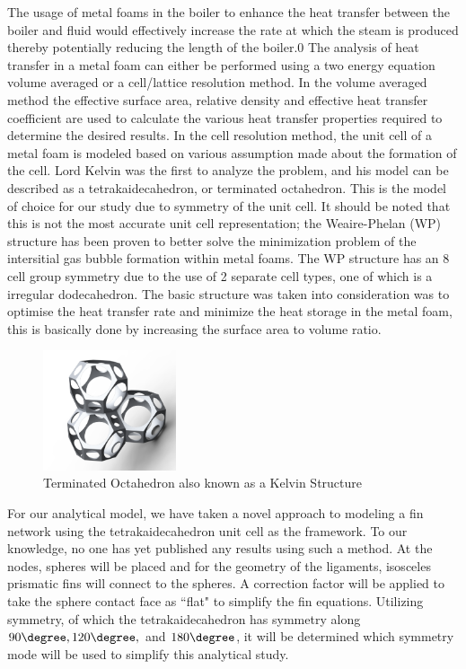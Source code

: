 \documentclass[asme2ejs.tex]{subfiles}
\begin{document}
The usage of metal foams in the boiler to enhance the heat transfer between the boiler and fluid  would effectively increase the rate at which the steam is produced thereby potentially reducing the length of the boiler.0
The analysis of heat transfer in a metal foam can either be performed using a two energy equation volume averaged or a cell/lattice resolution method.
In the volume averaged method the effective surface area, relative density and effective heat transfer coefficient  are used to calculate the various heat transfer properties required to determine the desired results.
\cite{Du2010}
In the cell resolution method, the unit cell of a metal foam is modeled based on various assumption made about the formation of the cell. 
Lord Kelvin was the first to analyze the problem, and his model can be described as a tetrakaidecahedron, or terminated octahedron.
\cite{Kopanidis2010}
This is the model of choice for our study due to symmetry of the unit cell.
It should be noted that this is not the most accurate unit cell representation; the Weaire-Phelan (WP) structure has been proven to better solve the minimization problem of the intersitial gas bubble formation within metal foams. 
The WP structure has an 8 cell group symmetry due to the use of 2 separate cell types, one of which is a irregular dodecahedron.
The basic structure was taken into consideration was to optimise the heat transfer rate and minimize the heat storage in the metal foam, this is basically done by increasing the surface area to volume ratio.
\cite{Kusner1996}

\begin{figure}[t]
\begin{center}
\includegraphics[width=0.35\textwidth]{./figure/CellGroup2}
\end{center}
\caption{Terminated Octahedron also known as a Kelvin Structure}
\label{fig:flowregime}
\end{figure}

For our analytical model, we have taken a novel approach to modeling a fin network using the tetrakaidecahedron unit cell as the framework.
To our knowledge, no one has yet published any results using such a method. 
At the nodes, spheres will be placed and for the geometry of the ligaments, isosceles prismatic fins will connect to the spheres. 
A correction factor will be applied to take the sphere contact face as ``flat" to simplify the fin equations. 
Utilizing symmetry, of which the tetrakaidecahedron has symmetry along $90\degree, 120\degree,$ and $180\degree$, it will be determined which symmetry mode will be used to simplify this analytical study.
\end{document}
